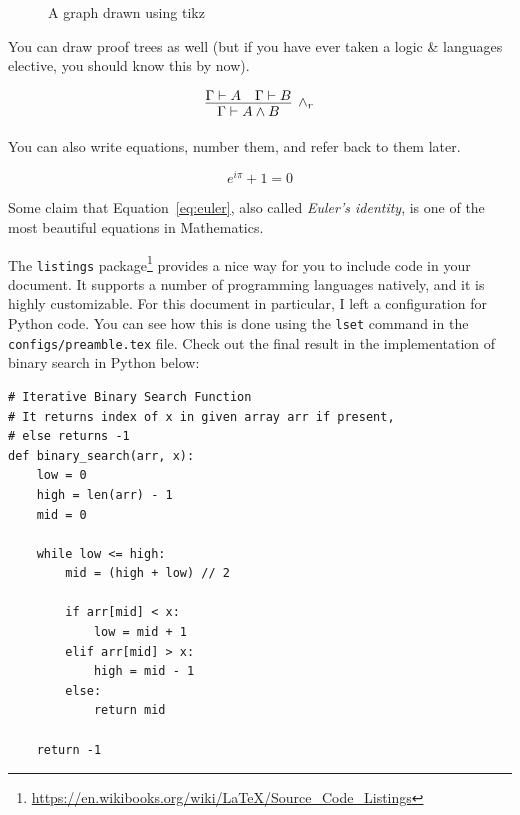 \begin{figure}[h]
\begin{center}
\caption{A graph drawn using tikz}
\label{fig:tikz}
\end{center}
\end{figure}

You can draw proof trees as well (but if you have ever taken a logic \& languages elective, you should know this by now).

\[
    \infer[\wedge_r]{\Gamma \vdash A \wedge B}{
        \Gamma \vdash A
        &
        \Gamma \vdash B
    }
\]

You can also write equations, number them, and refer back to them later.

\begin{equation}
\label{eq:euler}
    e^{i\pi} + 1 = 0
\end{equation}

Some claim that Equation~\ref{eq:euler}, also called \emph{Euler's identity}, is one of the most beautiful equations in Mathematics.

The \texttt{listings} package\footnote{\url{https://en.wikibooks.org/wiki/LaTeX/Source_Code_Listings}} provides a nice way for you to include code in your document. It supports a number of programming languages natively, and it is highly customizable. For this document in particular, I left a configuration for Python code. You can see how this is done using the \texttt{lset} command in the \texttt{configs/preamble.tex} file. Check out the final result in the implementation of binary search in Python below:

\begin{lstlisting}
# Iterative Binary Search Function
# It returns index of x in given array arr if present,
# else returns -1
def binary_search(arr, x):
    low = 0
    high = len(arr) - 1
    mid = 0
 
    while low <= high:
        mid = (high + low) // 2

        if arr[mid] < x:
            low = mid + 1
        elif arr[mid] > x:
            high = mid - 1
        else:
            return mid
 
    return -1
\end{lstlisting}